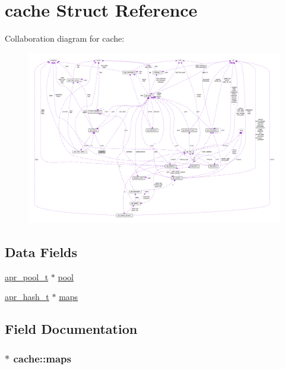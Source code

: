 \hypertarget{structcache}{}\section{cache Struct Reference}
\label{structcache}


Collaboration diagram for cache\+:
\nopagebreak
\begin{figure}[H]
\begin{center}
\leavevmode
\includegraphics[width=350pt]{structcache__coll__graph}
\end{center}
\end{figure}
\subsection*{Data Fields}
\begin{DoxyCompactItemize}
\item 
\hyperlink{structapr__pool__t}{apr\+\_\+pool\+\_\+t} $\ast$ \hyperlink{structcache_a79d8858cd01a77bb888a087f5f3fdc6d}{pool}
\item 
\hyperlink{structapr__hash__t}{apr\+\_\+hash\+\_\+t} $\ast$ \hyperlink{structcache_af13a05a91fcfef6a3d6bd297735646ee}{maps}
\end{DoxyCompactItemize}


\subsection{Field Documentation}
\subsubsection[{\texorpdfstring{maps}{maps}}]{$\ast$ cache\+::maps}\hypertarget{structcache_af13a05a91fcfef6a3d6bd297735646ee}{}\label{structcache_af13a05a91fcfef6a3d6bd297735646ee}

